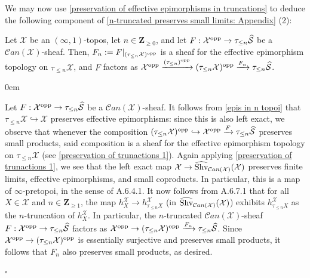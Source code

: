 \documentclass[10pt]{article}
\newcommand{\mS}{\mathcal S}
\newcommand{\C}{\mathcal C}
\newcommand{\cX}{\mathcal{X}}
\newcommand{\ZZ}{\mathbb{Z}}
\def\ZZ{{\mathbf Z}}
\renewcommand{\qed}{\hfill$\square$}
\renewenvironment{proof}{\begin{addmargin}[1em]{0em}\begin{newproof}}{\end{newproof}\end{addmargin}\qed}
\theoremstyle{witharg}
\theoremstyle{witharg}
\theoremstyle{witharg2}
\begin{document}
\noindent We may now use \ref{preservation of effective epimorphisms in truncations} to deduce the following component of \ref{n-truncated preserves small limits: Appendix} (2): 

\begin{corollary}{}\label{Partial. Truncated Objects of Shv Can X}
    

    Let $\cX$ be an $(\infty,1)$-topos, let $n\in \ZZ_{\geq 0}$, and let $F:\cX^{\textnormal{opp}}\rightarrow \tau_{\leq n}\widehat{\mS}$ be a $\C an(\cX)$-sheaf. Then, $F_{n}:=F|_{(\tau_{\leq n}\cX)^{\textnormal{opp}}}$ is a sheaf for the effective epimorphism topology on $\tau_{\leq n}\cX$, and $F$ factors as $\cX^{\textnormal{opp}}\xrightarrow{(\tau_{\leq n})^{\textnormal{opp}}} (\tau_{\leq n}\cX)^{\textnormal{opp}}\xrightarrow{F_{n}} \tau_{\leq n}\widehat{\mS}$. 
    
    
\end{corollary}

\begin{proof}

    Let $F:\cX^{\textnormal{opp}}\rightarrow \tau_{\leq n}\widehat{\mS}$ be a $\C an(\cX)$-sheaf. It follows from \ref{epis in n topoi} that $\tau_{\leq n}\cX\hookrightarrow \cX$ preserves effective epimorphisms: since this is also left exact, we observe that whenever the composition $(\tau_{\leq n}\cX)^{\textnormal{opp}}\hookrightarrow \cX^{\textnormal{opp}}\xrightarrow{F} \tau_{\leq n}\widehat{\mS}$ preserves small products, said composition is a sheaf for the effective epimorphism topology on $\tau_{\leq n}\cX$ (see \ref{preservation of trunactions 1}). Again applying \ref{preservation of trunactions 1}, we see that the left exact map $\cX\rightarrow \widehat{\textnormal{Shv}}_{\C an(\cX)}(\cX)$ preserves finite limits, effective epimorphisms, and small coproducts. In particular, this is a map of $\infty$-pretopoi, in the sense of  A.6.4.1. It now follows from  A.6.7.1 that for all $X\in \cX$ and $n\in \ZZ_{\geq 1}$, the map $h^\cX_X\rightarrow h^{\cX}_{\tau_{\leq n}X}$ (in $\widehat{\textnormal{Shv}}_{\C an(\cX)}(\cX)$) exhibits $h^{\cX}_{\tau_{\leq n}X}$ as the $n$-truncation of $h^\cX_X$. In particular, the $n$-truncated $\C an(\cX)$-sheaf $F:\cX^{\textnormal{opp}}\rightarrow \tau_{\leq n}\widehat{\mS}$ factors as $\cX^{\textnormal{opp}}\rightarrow (\tau_{\leq n}\cX)^{\textnormal{opp}}\xrightarrow{F_{n}}\tau_{\leq n}\widehat{\mS}$. Since $\cX^{\textnormal{opp}}\rightarrow (\tau_{\leq n}\cX)^{\textnormal{opp}}$ is essentially surjective and preserves small products, it follows that $F_{n}$ also preserves small products, as desired.

\end{proof}
\end{document}
